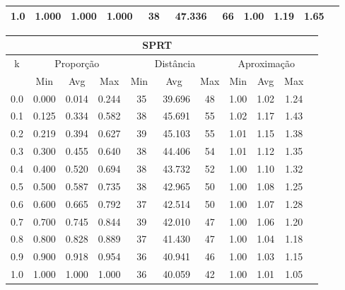 \begin{table}[!p]
\begin{center}
{\begin{tabular}{|c|c|c|c|c|c|c|c|c|c|c|}
1.0                & 1.000     & 1.000    & 1.000    & ~38      & ~47.336  & ~66     & 1.00    & 1.19   & 1.65            \\ \hline
\end{tabular}%
\vspace{5pt}
\begin{tabular}{|c|c|c|c|c|c|c|c|c|c|c|}
\hline
\multicolumn{10}{|c|}{\bf SPRT}                                                                                           \\ \hline
\multirow{2}{*}{k} & \multicolumn{3}{c|}{Proporção}  & \multicolumn{3}{c|}{Distância} & \multicolumn{3}{c|}{Aproximação}  \\ \cline{2-10}
                   & Min       & Avg      & Max      & Min      & Avg      & Max     & Min     & Avg    & Max             \\ \hline
0.0                & 0.000     & 0.014    & 0.244    & ~35      & ~39.696  & 48      & 1.00    & 1.02   & 1.24            \\ \hline
0.1                & 0.125     & 0.334    & 0.582    & ~38      & ~45.691  & 55      & 1.02    & 1.17   & 1.43            \\ \hline
0.2                & 0.219     & 0.394    & 0.627    & ~39      & ~45.103  & 55      & 1.01    & 1.15   & 1.38            \\ \hline
0.3                & 0.300     & 0.455    & 0.640    & ~38      & ~44.406  & 54      & 1.01    & 1.12   & 1.35            \\ \hline
0.4                & 0.400     & 0.520    & 0.694    & ~38      & ~43.732  & 52      & 1.00    & 1.10   & 1.32            \\ \hline
0.5                & 0.500     & 0.587    & 0.735    & ~38      & ~42.965  & 50      & 1.00    & 1.08   & 1.25            \\ \hline
0.6                & 0.600     & 0.665    & 0.792    & ~37      & ~42.514  & 50      & 1.00    & 1.07   & 1.28            \\ \hline
0.7                & 0.700     & 0.745    & 0.844    & ~39      & ~42.010  & 47      & 1.00    & 1.06   & 1.20            \\ \hline
0.8                & 0.800     & 0.828    & 0.889    & ~37      & ~41.430  & 47      & 1.00    & 1.04   & 1.18            \\ \hline
0.9                & 0.900     & 0.918    & 0.954    & ~36      & ~40.941  & 46      & 1.00    & 1.03   & 1.15            \\ \hline
1.0                & 1.000     & 1.000    & 1.000    & ~36      & ~40.059  & 42      & 1.00    & 1.01   & 1.05            \\ \hline
\end{tabular}%
}
\end{center}
\end{table}
